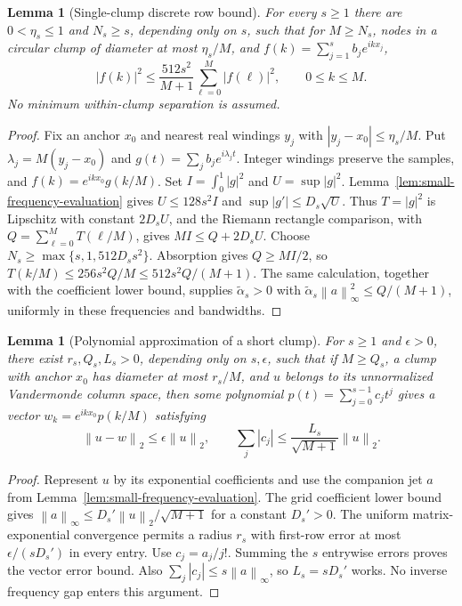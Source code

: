 \documentclass[11pt]{article}
\newtheorem{lemma}[theorem]{Lemma}
\theoremstyle{remark}\newtheorem{remark}[theorem]{Remark}
\newcommand{\norm}[1]{\left\lVert#1\right\rVert}
\newcommand{\abs}[1]{\left|#1\right|}
\begin{document}
\begin{lemma}[Single-clump discrete row bound]
\label{lem:single-clump-row}
For every $s\ge1$ there are $0<\eta_s\le1$ and $N_s\ge s$, depending
only on $s$, such that for $M\ge N_s$, nodes in a circular clump of diameter
at most $\eta_s/M$, and $f(k)=\sum_{j=1}^sb_je^{ikx_j}$,
\begin{equation}
 \label{eq:single-clump-row}
 \abs{f(k)}^2\le\frac{512s^2}{M+1}
                 \sum_{\ell=0}^{M}\abs{f(\ell)}^2,
 \qquad 0\le k\le M.
\end{equation}
No minimum within-clump separation is assumed.
\end{lemma}
\begin{proof}
Fix an anchor $x_0$ and nearest real windings $y_j$ with
$\abs{y_j-x_0}\le\eta_s/M$. Put $\lambda_j=M(y_j-x_0)$ and
$g(t)=\sum_jb_je^{i\lambda_jt}$. Integer windings preserve the samples,
and $f(k)=e^{ikx_0}g(k/M)$. Set $I=\int_0^1\abs g^2$ and
$U=\sup\abs g^2$. Lemma~\ref{lem:small-frequency-evaluation} gives
$U\le128s^2I$ and $\sup\abs{g'}\le D_s\sqrt U$.
Thus $T=\abs g^2$ is Lipschitz with constant $2D_sU$, and the Riemann
rectangle comparison, with $Q=\sum_{\ell=0}^{M}T(\ell/M)$, gives
$MI\le Q+2D_sU$. Choose $N_s\ge\max\{s,1,512D_ss^2\}$.
Absorption gives $Q\ge MI/2$, so
$T(k/M)\le256s^2Q/M\le512s^2Q/(M+1)$.
The same calculation, together with the coefficient lower bound, supplies
$\widetilde\alpha_s>0$ with
$\widetilde\alpha_s\norm a_\infty^2\le Q/(M+1)$, uniformly in these
frequencies and bandwidths.
\end{proof}

\begin{lemma}[Polynomial approximation of a short clump]
\label{lem:clump-polynomial-approximation}
For $s\ge1$ and $\epsilon>0$, there exist $r_s,Q_s,L_s>0$, depending
only on $s,\epsilon$, such that if $M\ge Q_s$, a clump with anchor $x_0$
has diameter at most $r_s/M$, and $u$ belongs to its unnormalized
Vandermonde column space, then some polynomial
$p(t)=\sum_{j=0}^{s-1}c_jt^j$ gives a vector
$w_k=e^{ikx_0}p(k/M)$ satisfying
\[
 \norm{u-w}_2\le\epsilon\norm u_2,
 \qquad \sum_j\abs{c_j}\le\frac{L_s}{\sqrt{M+1}}\norm u_2.
\]
\end{lemma}
\begin{proof}
Represent $u$ by its exponential coefficients and use the companion jet
$a$ from Lemma~\ref{lem:small-frequency-evaluation}.
The grid coefficient lower bound gives
$\norm a_\infty\le D_s'\norm u_2/\sqrt{M+1}$ for a constant $D_s'>0$.
The uniform matrix-exponential convergence permits a radius $r_s$ with
first-row error at most $\epsilon/(sD_s')$ in every entry.
Use $c_j=a_j/j!$. Summing the $s$ entrywise errors proves the vector
error bound. Also $\sum_j\abs{c_j}\le s\norm a_\infty$, so $L_s=sD_s'$
works. No inverse frequency gap enters this argument.
\end{proof}
\end{document}
